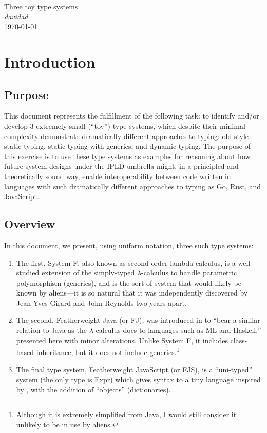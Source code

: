 \documentclass[11pt]{article}
\begin{document}
{\LARGE Three toy type systems} \\[2mm]
{\Large \itshape davidad} \\[2mm]
{\large \today}

\section{Introduction}

\subsection{Purpose}

This document represents the fulfillment of the following task: to identify and/or develop 3 extremely small (``toy'') type systems, which despite their minimal complexity demonstrate dramatically different approaches to typing: old-style static typing, static typing with generics, and dynamic typing.
The purpose of this exercise is to use these type systems as examples for reasoning about how future system designs under the IPLD umbrella might, in a principled and theoretically sound way, enable interoperability between code written in languages with such dramatically different approaches to typing as Go, Rust, and JavaScript.

\subsection{Overview}

In this document, we present, using uniform notation, three such type systems:
\begin{enumerate}
	\item The first, System F, also known as second-order lambda calculus, is a well-studied extension of the simply-typed $\lambda$-calculus to handle parametric polymorphism (generics), and is the sort of system that would likely be known by aliens---it is so natural that it was independently discovered by Jean-Yves Girard \cite{Girard72} and John Reynolds \cite{Reynolds74} two years apart.
	\item The second, Featherweight Java (or FJ), was introduced in \cite{Igarashi01} to ``bear a similar relation to Java as the $\lambda$-calculus does to languages such as ML and Haskell,'' presented here with minor alterations. Unlike System F, it includes class-based inheritance, but it does not include generics.\footnote{Although it is extremely simplified from Java, I would still consider it unlikely to be in use by aliens.}
	\item The final type system, Featherweight JavaScript (or FJS), is a ``uni-typed'' system (the only type is \textsf{Expr}) which gives syntax to a tiny language inspired by \cite{Zhang16}, with the addition of ``objects'' (dictionaries).
\end{enumerate}
\end{document}
